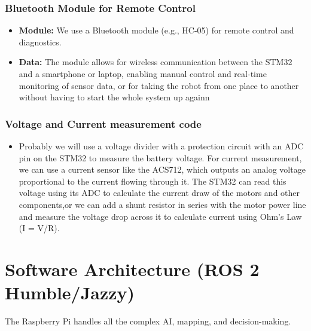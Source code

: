 \documentclass[12pt, a4paper]{article}
\begin{document}
\subsubsection{Bluetooth Module for Remote Control}
\begin{itemize}
    \item \textbf{Module:} We use a Bluetooth module (e.g., HC-05) for remote control and diagnostics.
    \item \textbf{Data:} The module allows for wireless communication between the STM32 and a smartphone or laptop, enabling manual control and real-time monitoring of sensor data, or for taking the robot from one place to another without having to start the whole system up againn

\end{itemize}

\subsubsection{ Voltage and Current measurement code }

\begin{itemize}
    \item Probably we will use a voltage divider with a protection circuit with an ADC pin on the STM32 to measure the battery voltage. For current measurement, we can use a current sensor like the ACS712, which outputs an analog voltage proportional to the current flowing through it. The STM32 can read this voltage using its ADC to calculate the current draw of the motors and other components,or we can add a shunt resistor in series with the motor power line and measure the voltage drop across it to calculate current using Ohm's Law (I = V/R).
\end{itemize}

\newpage



\section{Software Architecture (ROS 2 Humble/Jazzy)}
The Raspberry Pi handles all the complex AI, mapping, and decision-making.
\end{document}
